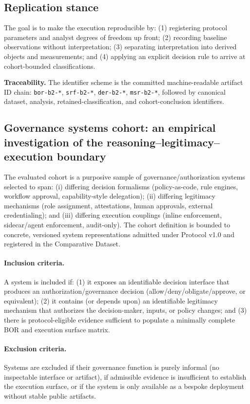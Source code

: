 \subsection{Replication stance}
The goal is to make the execution reproducible by:
(1) registering protocol parameters and analyst degrees of freedom up front;
(2) recording baseline observations without interpretation;
(3) separating interpretation into derived objects and measurements; and
(4) applying an explicit decision rule to arrive at cohort-bounded classifications.

\textbf{Traceability.} The identifier scheme is the committed machine-readable artifact ID chain: \texttt{bor-b2-*}, \texttt{srf-b2-*}, \texttt{der-b2-*}, \texttt{msr-b2-*}, followed by canonical dataset, analysis, retained-classification, and cohort-conclusion identifiers.

\subsection{Governance systems cohort: an empirical investigation of the reasoning--legitimacy--execution boundary}
\label{sec:cohort}
The evaluated cohort is a purposive sample of governance/authorization systems selected to span: (i) differing decision formalisms (policy-as-code, rule engines, workflow approval, capability-style delegation); (ii) differing legitimacy mechanisms (role assignment, attestations, human approvals, external credentialing); and (iii) differing execution couplings (inline enforcement, sidecar/agent enforcement, audit-only). The cohort definition is bounded to concrete, versioned system representations admitted under Protocol v1.0 and registered in the Comparative Dataset.

\paragraph{Inclusion criteria.}
A system is included if: (1) it exposes an identifiable decision interface that produces an authorization/governance decision (allow/deny/obligate/approve, or equivalent); (2) it contains (or depends upon) an identifiable legitimacy mechanism that authorizes the decision-maker, inputs, or policy changes; and (3) there is protocol-eligible evidence sufficient to populate a minimally complete BOR and execution surface matrix.

\paragraph{Exclusion criteria.}
Systems are excluded if their governance function is purely informal (no inspectable interface or artifact), if admissible evidence is insufficient to establish the execution surface, or if the system is only available as a bespoke deployment without stable public artifacts.

